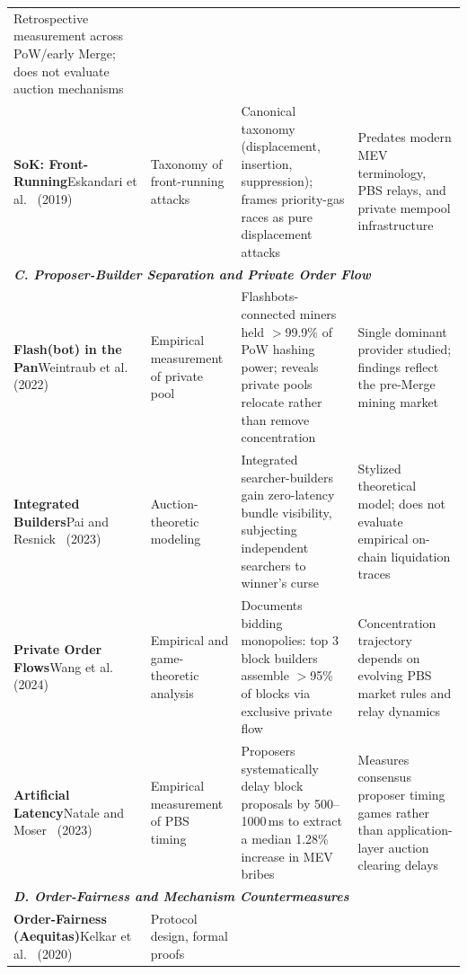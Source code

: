 \documentclass[conference]{IEEEtran}
\begin{document}
\begin{table}[!t]
\begin{tabular}{p{3.0cm}p{3.1cm}p{6.4cm}p{4.5cm}}
Retrospective measurement across PoW/early Merge; does not evaluate auction mechanisms \\
\textbf{SoK: Front-Running}\newline Eskandari et al.~\cite{eskandari2019sok} (2019) &
Taxonomy of front-running attacks &
Canonical taxonomy (displacement, insertion, suppression); frames priority-gas races as pure displacement attacks &
Predates modern MEV terminology, PBS relays, and private mempool infrastructure \\
\midrule
\multicolumn{4}{l}{\textit{\textbf{C. Proposer-Builder Separation and Private Order Flow}}} \\
\midrule
\textbf{Flash(bot) in the Pan}\newline Weintraub et al.~\cite{weintraub2022flashbot} (2022) &
Empirical measurement of private pool &
Flashbots-connected miners held $>$99.9\% of PoW hashing power; reveals private pools relocate rather than remove concentration &
Single dominant provider studied; findings reflect the pre-Merge mining market \\
\textbf{Integrated Builders}\newline Pai and Resnick~\cite{pai2023structural} (2023) &
Auction-theoretic modeling &
Integrated searcher-builders gain zero-latency bundle visibility, subjecting independent searchers to winner's curse &
Stylized theoretical model; does not evaluate empirical on-chain liquidation traces \\
\textbf{Private Order Flows}\newline Wang et al.~\cite{wang2024private} (2024) &
Empirical and game-theoretic analysis &
Documents bidding monopolies: top 3 block builders assemble $>$95\% of blocks via exclusive private flow &
Concentration trajectory depends on evolving PBS market rules and relay dynamics \\
\textbf{Artificial Latency}\newline Natale and Moser~\cite{natale2023cost} (2023) &
Empirical measurement of PBS timing &
Proposers systematically delay block proposals by 500--1000\,ms to extract a median 1.28\% increase in MEV bribes &
Measures consensus proposer timing games rather than application-layer auction clearing delays \\
\midrule
\multicolumn{4}{l}{\textit{\textbf{D. Order-Fairness and Mechanism Countermeasures}}} \\
\midrule
\textbf{Order-Fairness (Aequitas)}\newline Kelkar et al.~\cite{kelkar2020order} (2020) &
Protocol design, formal proofs &

\end{tabular}
\end{table}
\end{document}
